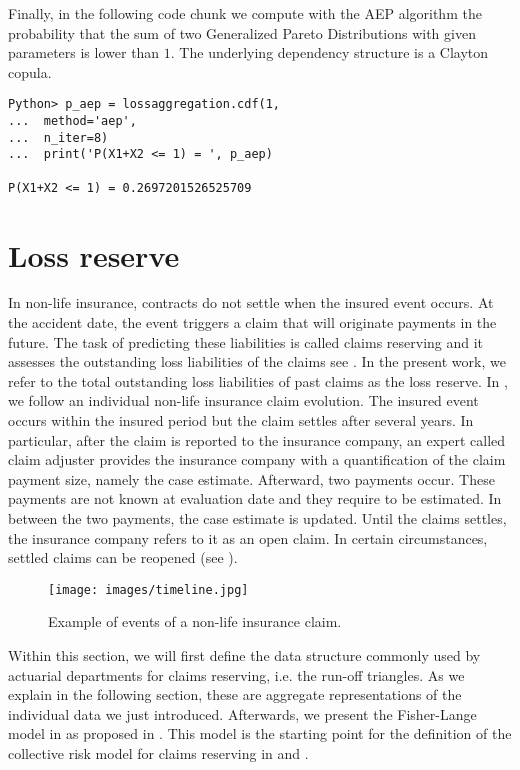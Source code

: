 \documentclass{article}
\begin{document}
Finally, in the following code chunk we compute with the AEP algorithm the probability that the sum of two Generalized Pareto Distributions with given parameters is lower than $1$. The underlying dependency structure is a Clayton copula.

\begin{lstlisting}
Python> p_aep = lossaggregation.cdf(1,
...  method='aep',
...  n_iter=8)
...  print('P(X1+X2 <= 1) = ', p_aep)

P(X1+X2 <= 1) = 0.2697201526525709
\end{lstlisting}

\section{Loss reserve}
\label{sec:lossreserve}

In non-life insurance, contracts do not settle when the insured event occurs. At the accident date, the event triggers a claim that will originate payments in the future. The task of predicting these liabilities is called claims reserving and it assesses the outstanding loss liabilities of the claims see \cite[p~11]{wuthrich15}. In the present work, we refer to the total outstanding loss liabilities of past claims as the loss reserve. In , we follow an individual non-life insurance claim evolution. The insured event occurs within the insured period but the claim settles after several years. In particular, after the claim is reported to the insurance company, an expert called claim adjuster provides the insurance company with a quantification of the claim payment size, namely the case estimate. Afterward, two payments occur. These payments are not known at evaluation date and they require to be estimated. In between the two payments, the case estimate is updated. Until the claims settles, the insurance company refers to it as an open claim. In certain circumstances, settled claims can be reopened (see \cite[p~431]{friedland10}).

\begin{figure}
\centering
    \centering\texttt{[image: images/timeline.jpg]}
    \caption{Example of events of a non-life insurance claim.}
    \label{fig:timeline}
\end{figure}

Within this section, we will first define the data structure commonly used by actuarial departments for claims reserving, i.e. the run-off triangles. As we explain in the following section, these are aggregate representations of the individual data we just introduced. Afterwards, we present the Fisher-Lange model in \cite{fisher99} as proposed in \cite{savelliDATA}. This model is the starting point for the definition of the collective risk model for claims reserving in \cite{ricotta16} and \cite{clemente19}.
\end{document}
